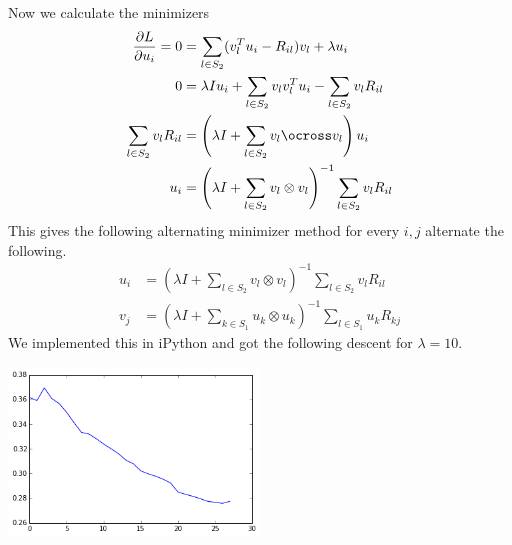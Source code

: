 \documentclass[letter]{article}
\newenvironment{menumerate}{%
  \edef\backupindent{\the\parindent}%
  \enumerate%
  \setlength{\parindent}{\backupindent}%
}{\endenumerate}
\begin{document}
\begin{menumerate}
\begin{menumerate}
  Now we calculate the minimizers
  \begin{equation*}
  \begin{aligned}
   \frac{\partial L}{\partial u_i} = 0 &= \sum_{l \in S_2} (v_l^Tu_i - R_{il})v_l + \lambda u_i \\
   0 &= \lambda I u_i + \sum_{l \in S_2} v_lv_l^Tu_i -  \sum_{l \in S_2}  v_lR_{il}  \\
   \sum_{l \in S_2}  v_lR_{il} &= \left(\lambda I + \sum_{l \in S_2} v_l\ocross v_l\right) u_i \\
   u_i &= \left(\lambda I + \sum_{l \in S_2} v_l\otimes v_l\right)^{-1} \sum_{l \in S_2}  v_lR_{il}
  \end{aligned}
  \end{equation*}
  This gives the following alternating minimizer method for every $i,j$ alternate the following.
  \begin{equation}
  \begin{aligned}
       u_i &= \left(\lambda I + \sum_{l \in S_2} v_l\otimes v_l\right)^{-1} \sum_{l \in S_2}  v_lR_{il} \\
       v_j &= \left(\lambda I + \sum_{k \in S_1} u_k\otimes u_k\right)^{-1} \sum_{l \in S_1}  u_kR_{kj}
    \end{aligned}  
  \end{equation}
  We implemented this in iPython and got the following descent for $\lambda = 10$.
  \begin{center}
    \includegraphics[width=0.5\textwidth]{alternatingdescent.png}
  \end{center}
  \end{menumerate}
\end{menumerate}
\end{document}
